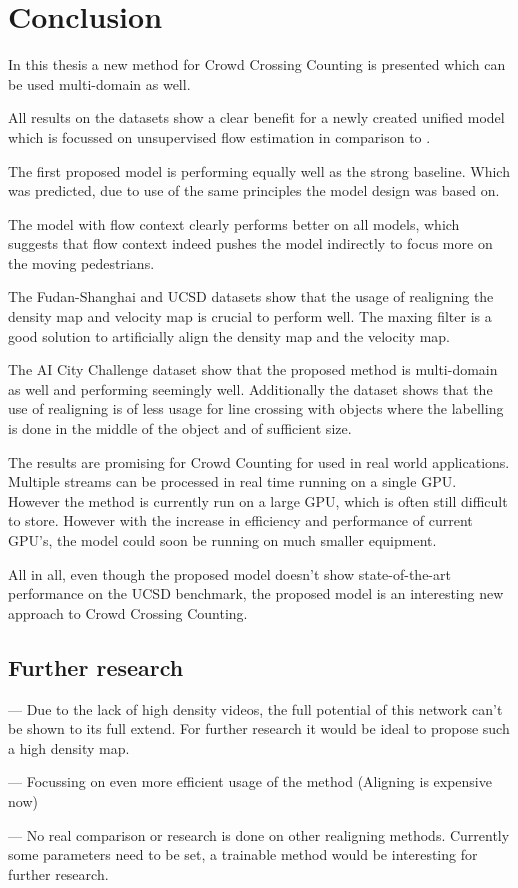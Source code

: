 \chapter{Conclusion}
In this thesis a new method for Crowd Crossing Counting is presented which can be used multi-domain as well.

All results on the datasets show a clear benefit for a newly created unified model which is focussed on unsupervised flow estimation in comparison to \cite{leibe_crossing-line_2016}.

The first proposed model is performing equally well as the strong baseline. Which was predicted, due to use of the same principles the model design was based on.

The model with flow context clearly performs better on all models, which suggests that flow context indeed pushes the model indirectly to focus more on the moving pedestrians.

The Fudan-Shanghai and UCSD datasets show that the usage of realigning the density map and velocity map is crucial to perform well. The maxing filter is a good solution to artificially align the density map and the velocity map.

The AI City Challenge dataset show that the proposed method is multi-domain as well and performing seemingly well. Additionally the dataset shows that the use of realigning is of less usage for line crossing with objects where the labelling is done in the middle of the object and of sufficient size.

The results are promising for Crowd Counting for used in real world applications. Multiple streams can be processed in real time running on a single GPU. However the method is currently run on a large GPU, which is often still difficult to store. However with the increase in efficiency and performance of current GPU's, the model could soon be running on much smaller equipment.

All in all, even though the proposed model doesn't show state-of-the-art performance on the UCSD benchmark, the proposed model is an interesting new approach to Crowd Crossing Counting.

\section{Further research}
--- Due to the lack of high density videos, the full potential of this network can't be shown to its full extend. For further research it would be ideal to propose such a high density map.

--- Focussing on even more efficient usage of the method (Aligning is expensive now)

--- No real comparison or research is done on other realigning methods. Currently some parameters need to be set, a trainable method would be interesting for further research.